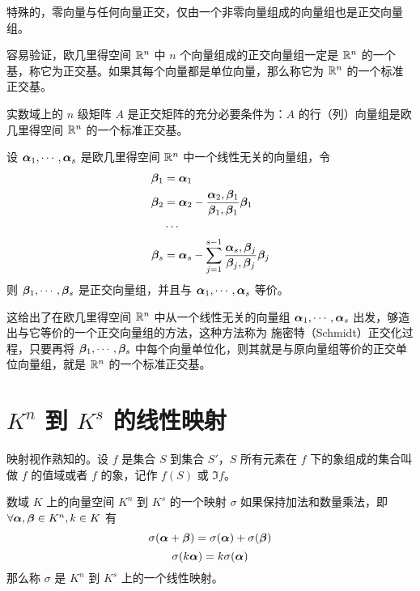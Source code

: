 特殊的，零向量与任何向量正交，仅由一个非零向量组成的向量组也是正交向量组。

容易验证，欧几里得空间 $\mathbb{R}^n$ 中 $n$ 个向量组成的正交向量组一定是 $\mathbb{R}^n$ 的一个基，称它为正交基。如果其每个向量都是单位向量，那么称它为 $\mathbb{R}^n$ 的一个标准正交基。

\begin{theorem}
    实数域上的 $n$ 级矩阵 $A$ 是正交矩阵的充分必要条件为：$A$ 的行（列）向量组是欧几里得空间 $\mathbb{R}^n$ 的一个标准正交基。
\end{theorem}

\begin{theorem}
    设 $\boldsymbol{\alpha}_1,\cdots,\boldsymbol{\alpha}_s$ 是欧几里得空间 $\mathbb{R}^n$ 中一个线性无关的向量组，令
    \begin{equation*}
        \begin{aligned}
            \boldsymbol{\beta}_1&=\boldsymbol{\alpha}_1\\
            \boldsymbol{\beta}_2&=\boldsymbol{\alpha}_2 - \frac{\boldsymbol{\alpha}_2,\boldsymbol{\beta}_1}{\boldsymbol{\beta}_1,\boldsymbol{\beta}_1}\boldsymbol{\beta}_1\\
            &\cdots \\
            \boldsymbol{\beta}_s &= \boldsymbol{\alpha}_s-\sum_{j=1}^{s-1}\frac{\boldsymbol{\alpha}_s,\boldsymbol{\beta}_j}{\boldsymbol{\beta}_j,\boldsymbol{\beta}_j}\boldsymbol{\beta}_j
        \end{aligned}
    \end{equation*}
    则 $\boldsymbol{\beta}_1,\cdots,\boldsymbol{\beta}_s$ 是正交向量组，并且与 $\boldsymbol{\alpha}_1,\cdots,\boldsymbol{\alpha}_s$ 等价。
\end{theorem}

这给出了在欧几里得空间 $\mathbb{R}^n$ 中从一个线性无关的向量组 $\boldsymbol{\alpha}_1,\cdots,\boldsymbol{\alpha}_s$ 出发，够造出与它等价的一个正交向量组的方法，这种方法称为 施密特（Schmidt）正交化过程，只要再将 $\boldsymbol{\beta}_1,\cdots,\boldsymbol{\beta}_s$ 中每个向量单位化，则其就是与原向量组等价的正交单位向量组，就是 $\mathbb{R}^n$ 的一个标准正交基。

\section{\texorpdfstring{$K^n$ 到 $K^s$ 的线性映射}{Kn 到 Ks 的线性映射}}

映射视作熟知的。设 $f$ 是集合 $S$ 到集合 $S'$，$S$ 所有元素在 $f$ 下的象组成的集合叫做 $f$ 的值域或者 $f$ 的象，记作 $f(S)$ 或 $\Im f$。

\begin{definition}
    数域 $K$ 上的向量空间 $K^n$ 到 $K^s$ 的一个映射 $\sigma$ 如果保持加法和数量乘法，即 $\forall \boldsymbol{\alpha},\boldsymbol{\beta} \in K^n,k\in K$ 有
    $$\sigma (\boldsymbol{\alpha}+\boldsymbol{\beta}) = \sigma(\boldsymbol{\alpha}) + \sigma(\boldsymbol{\beta})$$
    $$\sigma(k\boldsymbol{\alpha}) = k\sigma(\boldsymbol{\alpha})$$
    那么称 $\sigma$ 是 $K^n$ 到 $K^s$ 上的一个线性映射。
\end{definition}

